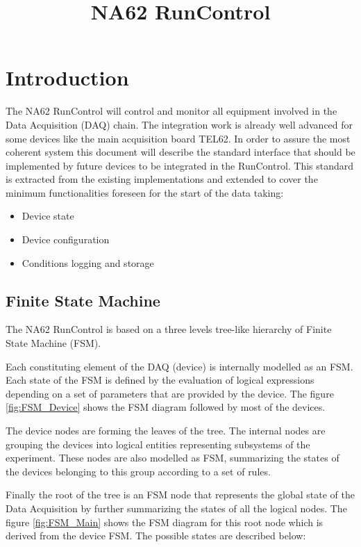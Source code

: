 \documentclass[a4paper]{article}
\title{NA62 RunControl}
\begin{document}
\maketitle

\linenumbers

\section{Introduction}
The NA62 RunControl will control and monitor all equipment involved in the Data Acquisition
(DAQ) chain. The integration work is already well advanced for some devices like the main
acquisition board TEL62\cite{biblio:TEL62}. In order to assure the most coherent system this
document will describe the standard interface that should be implemented by future devices to be
integrated in the RunControl. This standard is extracted from the existing implementations and
extended to cover the minimum functionalities foreseen for the start of the data taking:
\begin{itemize}
	\item Device state
	\item Device configuration
	\item Conditions logging and storage
\end{itemize} 

\subsection{Finite State Machine}
The NA62 RunControl is based on a three levels tree-like hierarchy of Finite State Machine (FSM).

Each constituting element of the DAQ (device) is internally modelled as an FSM. Each state of the
FSM is defined by the evaluation of logical expressions depending on a set of parameters that are
provided by the device. The figure \ref{fig:FSM_Device} shows the FSM diagram followed by most of
the devices.

The device nodes are forming the leaves of the tree. The internal nodes are grouping the devices
into logical entities representing subsystems of the experiment. These nodes are also modelled as
FSM, summarizing the states of the devices belonging to this group according to a set of rules.

Finally the root of the tree is an FSM node that represents the global state of the Data Acquisition
by further summarizing the states of all the logical nodes. The figure \ref{fig:FSM_Main} shows the
FSM diagram for this root node which is derived from the device FSM. The possible states are
described below:
\end{document}
